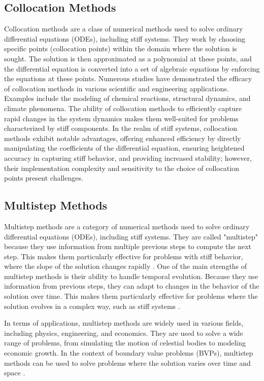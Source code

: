 \documentclass{report}
\begin{document}
\subsection{Collocation Methods}
Collocation methods are a class of numerical methods used to solve ordinary differential equations (ODEs), including stiff systems. They work by choosing specific points (collocation points) within the domain where the solution is sought. The solution is then approximated as a polynomial at these points, and the differential equation is converted into a set of algebraic equations by enforcing the equations at these points.
Numerous studies have demonstrated the efficacy of collocation methods in various scientific and engineering applications. Examples include the modeling of chemical reactions, structural dynamics, and climate phenomena. The ability of collocation methods to efficiently capture rapid changes in the system dynamics makes them well-suited for problems characterized by stiff components.
In the realm of stiff systems, collocation methods exhibit notable advantages, offering enhanced efficiency by directly manipulating the coefficients of the differential equation, ensuring heightened accuracy in capturing stiff behavior, and providing increased stability; however, their implementation complexity and sensitivity to the choice of collocation points present challenges\cite{Faleichik2009ExplicitIO}.

\subsection{Multistep Methods}
Multistep methods are a category of numerical methods used to solve ordinary differential equations (ODEs), including stiff systems. They are called "multistep" because they use information from multiple previous steps to compute the next step. This makes them particularly effective for problems with stiff behavior, where the slope of the solution changes rapidly \cite{math7121158}.
One of the main strengths of multistep methods is their ability to handle temporal evolution. Because they use information from previous steps, they can adapt to changes in the behavior of the solution over time. This makes them particularly effective for problems where the solution evolves in a complex way, such as stiff systems \cite{math7121158}.

In terms of applications, multistep methods are widely used in various fields, including physics, engineering, and economics. They are used to solve a wide range of problems, from simulating the motion of celestial bodies to modeling economic growth. In the context of boundary value problems (BVPs), multistep methods can be used to solve problems where the solution varies over time and space \cite{math7121158}.
\end{document}

